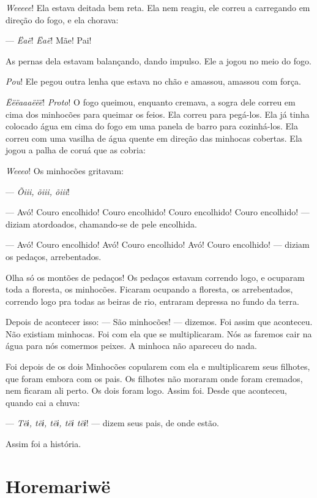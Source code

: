 \textit{Weeeee}! Ela estava deitada bem reta. Ela nem reagiu, ele correu a carregando
em direção do fogo, e ela chorava: 

--- \textit{Ëaë}! \textit{Ëaë}! Mãe! Pai! 

As pernas dela estavam balançando, dando impulso. Ele a jogou no meio
do fogo. 

\textit{Pou}! Ele pegou outra lenha que estava no chão e amassou, amassou com
força. 

\textit{Ëëëaaaëëë}! \textit{Proto}! O fogo queimou, enquanto cremava, a sogra dele correu
em cima dos minhocões para queimar os feios. Ela correu para pegá-los.
Ela já tinha colocado água em cima do fogo em uma panela de barro para
cozinhá-los. Ela correu com uma vasilha de água quente em direção das
minhocas cobertas. Ela jogou a palha de coruá que as cobria: 

\textit{Weeeo}! Os minhocões gritavam:

--- \textit{Õiii, õiii, õiii}! 

--- Avó! Couro encolhido! Couro encolhido! Couro encolhido! Couro
 encolhido! --- diziam atordoados, chamando-se de pele encolhida. 

--- Avó! Couro encolhido! Avó! Couro encolhido! Avó! Couro encolhido! ---
diziam os pedaços, arrebentados. 

Olha só os montões de pedaços! Os pedaços estavam correndo logo, e
ocuparam toda a floresta, os minhocões. Ficaram ocupando a floresta, os
arrebentados, correndo logo pra todas as beiras de rio, entraram depressa
no fundo da terra. 

Depois de acontecer isso: --- São minhocões! --- dizemos. Foi assim que aconteceu.
Não existiam minhocas. Foi com ela que se multiplicaram. Nós as faremos
cair na água para nós comermos peixes. A minhoca não apareceu do nada. 

Foi depois de os dois Minhocões copularem com ela e multiplicarem seus
filhotes, que foram embora com os pais. Os filhotes não moraram onde
foram cremados, nem ficaram ali perto. Os dois foram logo. Assim foi. Desde
que aconteceu, quando cai a chuva:

--- \textit{Tëɨ, tëɨ, tëɨ, tëɨ tëɨ}! --- dizem seus pais, de onde estão. 

Assim foi a história.

\chapter{Horemariwë}

